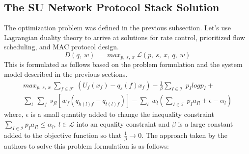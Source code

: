 \documentclass[12pt, draftcls, onecolumn]{IEEEtran}
\begin{document}
\subsection{The SU Network Protocol Stack Solution}
The optimization problem was defined in the previous subsection. Let's use Lagrangian duality theory to arrive at solutions for rate control, prioritized flow scheduling, and MAC protocol design.
\[D(q,\ w)\ =\ max_{p,\ s,\ x}\ \mathcal{L}(p,\ s,\ x,\ q,\ w)\]
This is formulated as follows based on the problem formulation and the system model described in the previous sections.
\begin{equation}
    \begin{aligned}
        max_{p,\ s,\ x}\ \sum_{f \in \mathcal{F}}\ (U_f(x_f) - q_s(f)x_f) - \frac{1}{\beta}\sum_{I \in \mathcal{I}}\ p_I log p_I + \\\sum_{l}\ \sum_{f}\ s_{fl}[w_f(q_{h(l)f} - q_{t(l)f})] - \sum_{l}\ w_l(\sum_{I \in \mathcal{I}}\ p_I a_{Il} + \epsilon - \alpha_l)
    \end{aligned}
\end{equation}
where, $\epsilon$ is a small quantity added to change the inequality constraint $\sum_{I \in \mathcal{I}} p_I a_{Il} \leq \alpha_l,\ l \in \mathcal{L}$ into an equality constraint and $\beta$ is a large constant added to the objective function so that $\frac{1}{\beta} \rightarrow 0$.
The approach taken by the authors to solve this problem formulation is as follows:
\end{document}
